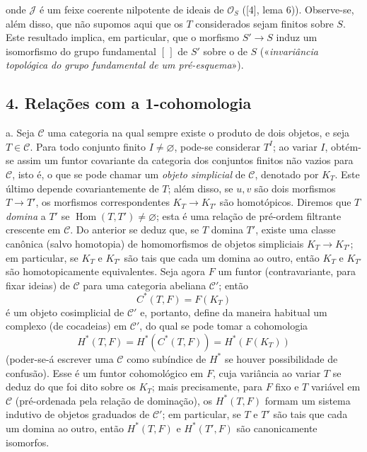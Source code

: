 onde $\mathcal J$ é um feixe coerente nilpotente de ideais de $\mathcal O_S$
([4], lema 6)). Observe-se, além disso, que não supomos aqui que os $T$
considerados sejam finitos sobre $S$. Este resultado implica, em particular,
que o morfismo $S'\longrightarrow S$ induz um isomorfismo do grupo
fundamental $[\,]$ de $S'$ sobre o de $S$ («\emph{invariância topológica do
grupo fundamental de um pré-esquema}»).

\subsection*{4. Relações com a 1-cohomologia}

\medskip\noindent
a. Seja $\mathcal C$ uma categoria na qual sempre existe o produto de dois
objetos, e seja $T\in\mathcal C$. Para todo conjunto finito
$I\ne\varnothing$, pode-se considerar $T^I$; ao variar $I$, obtém-se assim um
funtor covariante da categoria dos conjuntos finitos não vazios para
$\mathcal C$, isto é, o que se pode chamar um \emph{objeto simplicial} de
$\mathcal C$, denotado por $K_T$. Este último depende covariantemente de $T$;
além disso, se $u,v$ são dois morfismos $T\longrightarrow T'$, os morfismos
correspondentes $K_T\longrightarrow K_{T'}$ são homotópicos. Diremos que $T$
\emph{domina} a $T'$ se $\operatorname{Hom}(T,T')\ne\varnothing$; esta é uma
relação de pré-ordem filtrante crescente em $\mathcal C$. Do anterior se
deduz que, se $T$ domina $T'$, existe uma classe canônica (salvo homotopia)
de homomorfismos de objetos simpliciais $K_T\longrightarrow K_{T'}$; em
particular, se $K_T$ e $K_{T'}$ são tais que cada um domina ao outro, então
$K_T$ e $K_{T'}$ são homotopicamente equivalentes. Seja agora $F$ um funtor
(contravariante, para fixar ideias) de $\mathcal C$ para uma categoria abeliana
$\mathcal C'$; então
\[
  C^*(T,F)=F(K_T)
\]
é um objeto cosimplicial de $\mathcal C'$ e, portanto, define da maneira
habitual um complexo (de cocadeias) em $\mathcal C'$, do qual se pode tomar a
cohomologia
\[
  H^*(T,F)=H^*(C^*(T,F))=H^*(F(K_T))
\]
(poder-se-á escrever uma $\mathcal C$ como subíndice de $H^*$ se houver
possibilidade de confusão). Esse é um funtor cohomológico em $F$, cuja
variância ao variar $T$ se deduz do que foi dito sobre os $K_T$; mais
precisamente, para $F$ fixo e $T$ variável em $\mathcal C$ (pré-ordenada pela
relação de dominação), os $H^*(T,F)$ formam um sistema indutivo de objetos
graduados de $\mathcal C'$;
em particular, se $T$ e $T'$ são tais que cada um domina ao outro, então
$H^*(T,F)$ e $H^*(T',F)$ são canonicamente isomorfos.

